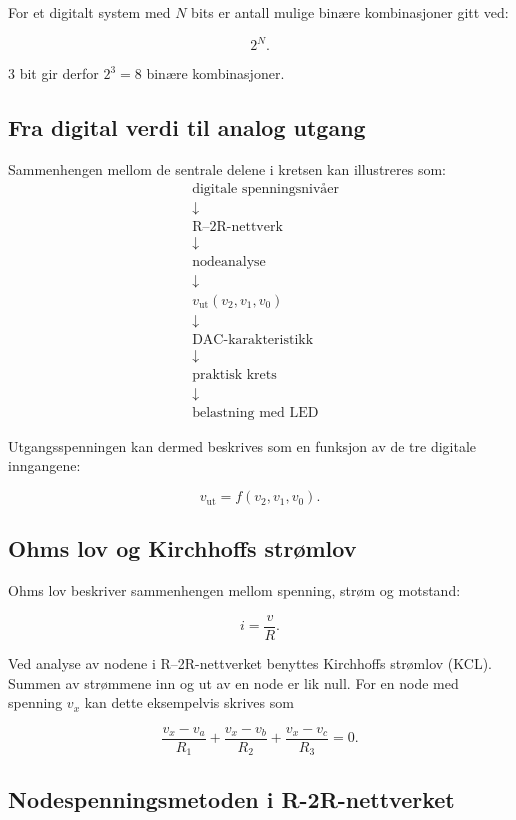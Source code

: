 \documentclass[11pt,a4paper,twocolumn]{article}
\begin{document}
For et digitalt system med \(N\) bits er antall mulige binære kombinasjoner gitt ved:

\[
2^N.
\]

3 bit gir derfor \(2^3 = 8\) binære kombinasjoner.

\subsection{Fra digital verdi til analog utgang}

Sammenhengen mellom de sentrale delene i kretsen kan illustreres som:
\[
\begin{aligned}
	&\text{digitale spenningsnivåer} \\
	&\downarrow \\
	&\text{R--2R-nettverk} \\
	&\downarrow \\
	&\text{nodeanalyse} \\
	&\downarrow \\
	&v_{\mathrm{ut}}(v_2,v_1,v_0) \\
	&\downarrow \\
	&\text{DAC-karakteristikk} \\
	&\downarrow \\
	&\text{praktisk krets} \\
	&\downarrow \\
	&\text{belastning med LED}
\end{aligned}
\]

Utgangsspenningen kan dermed beskrives som en funksjon av de tre digitale inngangene:

\[
v_{\mathrm{ut}} = f(v_2,v_1,v_0).
\]

\subsection{Ohms lov og Kirchhoffs strømlov}

Ohms lov beskriver sammenhengen mellom spenning, strøm og motstand:

\[
i = \frac{v}{R}.
\]

Ved analyse av nodene i R--2R-nettverket benyttes Kirchhoffs strømlov (KCL). 
Summen av strømmene inn og ut av en node er lik null. For en node med spenning
\(v_x\) kan dette eksempelvis skrives som

\[
\frac{v_x-v_a}{R_1}
+
\frac{v_x-v_b}{R_2}
+
\frac{v_x-v_c}{R_3}
= 0.
\]


\subsection{Nodespenningsmetoden i R-2R-nettverket}
\end{document}
